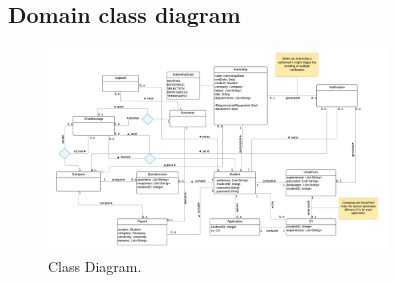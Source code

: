 \subsection{Domain class diagram}
\begin{figure}[H]
        \centering
        \includegraphics[width=0.8\textwidth]{RASD/Assets/ClassDiagram/Classdiagram.png}
        \caption{Class Diagram.}
        \label{fig:Class Diagram.}
    \end{figure}

